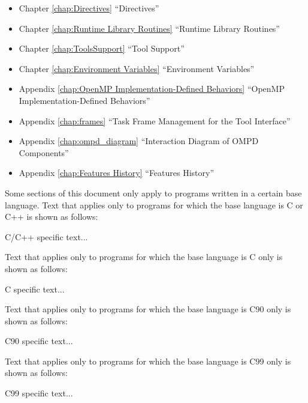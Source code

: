 \begin{itemize}
\item Chapter \ref{chap:Directives} ``Directives''

\item Chapter \ref{chap:Runtime Library Routines} ``Runtime Library Routines''

\item Chapter \ref{chap:ToolsSupport} ``Tool Support''

\item Chapter \ref{chap:Environment Variables} ``Environment Variables''

\item Appendix \ref{chap:OpenMP Implementation-Defined Behaviors} ``OpenMP Implementation-Defined Behaviors''

\item Appendix \ref{chap:frames} ``Task Frame Management for the Tool Interface''

\item Appendix \ref{chap:ompd_diagram} ``Interaction Diagram of OMPD Components''

\item Appendix \ref{chap:Features History} ``Features History''
\end{itemize}

Some sections of this document only apply to programs written in a certain base
language. Text that applies only to programs for which the base language is C or C++ is shown
as follows:

\begin{ccppspecific}
C/C++ specific text...
\end{ccppspecific}

Text that applies only to programs for which the base language is C only is shown as follows:

\begin{cspecific}
C specific text...
\end{cspecific}

Text that applies only to programs for which the base language is C90 only is shown as
follows:

\begin{c90specific}
C90 specific text...
\end{c90specific}

Text that applies only to programs for which the base language is C99 only is shown as
follows:

\begin{c99specific}
C99 specific text...
\end{c99specific}

